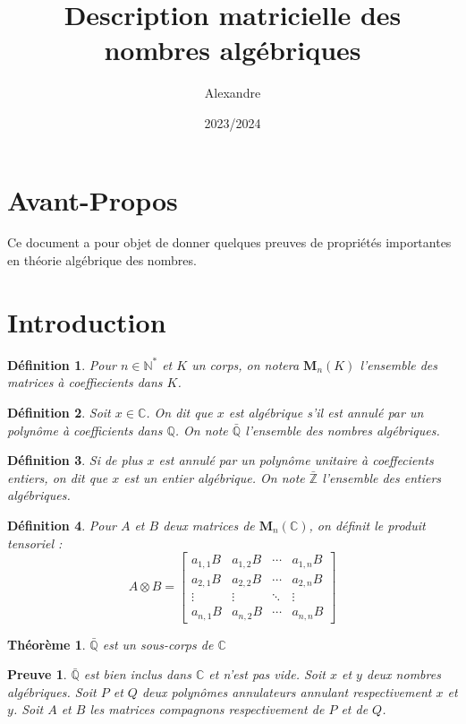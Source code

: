\documentclass[10pt,a4paper]{article}
\author{Alexandre}
\date{2023/2024}
\title{Description matricielle des nombres algébriques}
\newtheorem*{dem}{Preuve}
\newtheorem{thm}{Théorème}[section]
\newtheorem{defe}{Définition}[section]
\begin{document}
\maketitle

\section{Avant-Propos}

Ce document a pour objet de donner quelques preuves de propriétés importantes en théorie algébrique des nombres.

\section{Introduction}

\begin{defe}
	Pour $n\in \mathbb{N}^*$ et $K$ un corps, on notera $\mathbf{M}_n(K)$ l'ensemble des matrices à coeffiecients dans $K$.
\end{defe}


\begin{defe}
Soit $x \in \mathbb{C}$. On dit que $x$ est \textit{algébrique} s'il est annulé par un polynôme à coefficients dans $\mathbb{Q}$. 
On note $\bar{\mathbb{Q}}$ l'ensemble des nombres algébriques.
\end{defe}
\begin{defe}
Si de plus $x$ est annulé par un polynôme unitaire à coeffecients entiers, on dit que $x$ est un entier algébrique. 
On note $\bar{\mathbb{Z}}$ l'ensemble des entiers algébriques. 
\end{defe}

\begin{defe}
	Pour $A$ et $B$ deux matrices de $\mathbf{M}_n(\mathbb{C})$, on définit le produit tensoriel :
	$$ 
A \otimes B =\left[\begin{array}{cccc}
a_{1,1} B & a_{1,2} B & \cdots & a_{1,n} B \\
a_{2,1} B & a_{2,2} B & \cdots & a_{2,n} B \\
\vdots & \vdots & \ddots & \vdots \\
a_{n,1} B & a_{n,2} B & \cdots & a_{n,n} B
\end{array}\right]
$$
	
\end{defe}



\begin{thm}
$\bar{\mathbb{Q}}$ est un sous-corps de $\mathbb{C}$
\end{thm}

\begin{dem}
$\bar{\mathbb{Q}}$ est bien inclus dans $\mathbb{C}$ et n'est pas vide. Soit $x$ et $y$ deux nombres algébriques. Soit $P$ et $Q$ deux polynômes annulateurs annulant respectivement $x$ et $y$. Soit $A$ et $B$ les matrices compagnons respectivement de $P$ et de $Q$. 
\end{dem}



	
\end{document}
